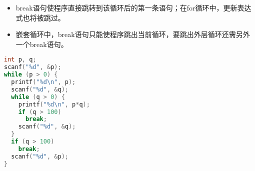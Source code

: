\begin{frame}[fragile]
\begin{itemize}
\item break语句使程序直接跳转到该循环后的第一条语句；在for循环中，更新表达式也将被跳过。\\[0.1in]
\item 
嵌套循环中，break语句只能使程序跳出当前循环，要跳出外层循环还需另外一个break语句。
\end{itemize}
\end{frame}


\begin{frame}[fragile]
\begin{lstlisting}[language=c,frame=single]
int p, q;
scanf("%d", &p);
while (p > 0) {
  printf("%d\n", p);
  scanf("%d", &q);
  while (q > 0) {
    printf("%d\n", p*q);
    if (q > 100)
      break;
    scanf("%d", &q);
  }
  if (q > 100)
    break;
  scanf("%d", &p);
}
\end{lstlisting}
\end{frame}


